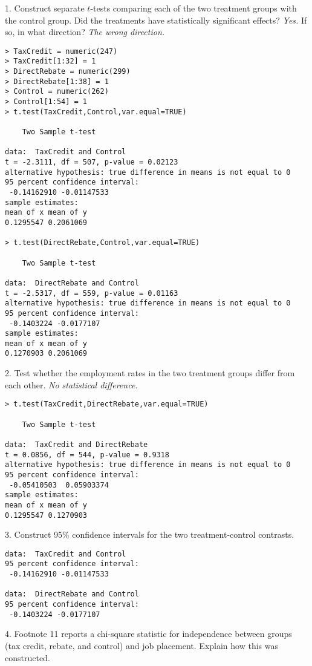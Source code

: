 \documentclass[12pt]{article}
\begin{document}
1. Construct separate $t$-tests comparing each of the two
treatment groups with the control group.
Did the treatments have statistically significant effects? {\it Yes.}
If so, in what direction? {\it The wrong direction.}

\begin{Verbatim}[fontsize=\small]
> TaxCredit = numeric(247)
> TaxCredit[1:32] = 1
> DirectRebate = numeric(299)
> DirectRebate[1:38] = 1
> Control = numeric(262)
> Control[1:54] = 1
> t.test(TaxCredit,Control,var.equal=TRUE)

	Two Sample t-test

data:  TaxCredit and Control
t = -2.3111, df = 507, p-value = 0.02123
alternative hypothesis: true difference in means is not equal to 0
95 percent confidence interval:
 -0.14162910 -0.01147533
sample estimates:
mean of x mean of y 
0.1295547 0.2061069 

> t.test(DirectRebate,Control,var.equal=TRUE)

	Two Sample t-test

data:  DirectRebate and Control
t = -2.5317, df = 559, p-value = 0.01163
alternative hypothesis: true difference in means is not equal to 0
95 percent confidence interval:
 -0.1403224 -0.0177107
sample estimates:
mean of x mean of y 
0.1270903 0.2061069 
\end{Verbatim}

2. Test whether the employment rates in the two treatment groups differ
from each other.
{\it No statistical difference.}

\begin{Verbatim}[fontsize=\small]
> t.test(TaxCredit,DirectRebate,var.equal=TRUE)

	Two Sample t-test

data:  TaxCredit and DirectRebate
t = 0.0856, df = 544, p-value = 0.9318
alternative hypothesis: true difference in means is not equal to 0
95 percent confidence interval:
 -0.05410503  0.05903374
sample estimates:
mean of x mean of y 
0.1295547 0.1270903 
\end{Verbatim}

3. Construct 95\% confidence intervals for the two treatment-control contrasts.

\begin{Verbatim}[fontsize=\small]
data:  TaxCredit and Control
95 percent confidence interval:
 -0.14162910 -0.01147533

data:  DirectRebate and Control
95 percent confidence interval:
 -0.1403224 -0.0177107
\end{Verbatim}

4. Footnote 11 reports a chi-square statistic for independence between groups
(tax credit, rebate, and control) and job placement.
Explain how this was constructed.
\end{document}
